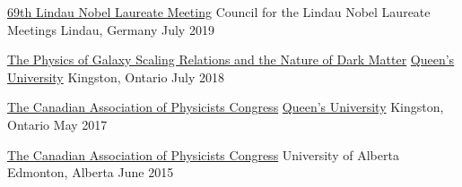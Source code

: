 \begin{cvhonors}
  \cvhonor
    {\href{https://www.lindau-nobel.org/}{69th Lindau Nobel Laureate Meeting}} %
    {Council for the Lindau Nobel Laureate Meetings} %
    {Lindau, Germany} %
    {July 2019} %

    
  \cvhonor
    {\href{https://darkmatter2018.weebly.com/}{The Physics of Galaxy Scaling Relations and the Nature of Dark Matter}} %
    {\href{https://www.queensu.ca/}{Queen's University}} %
    {Kingston, Ontario} %
    {July 2018} %

    
  \cvhonor
    {\href{https://www.cap.ca/congress-conference/past-congress/congress-2017/}{The Canadian Association of Physicists Congress}} %
    {\href{https://www.queensu.ca/}{Queen's University}} %
    {Kingston, Ontario} %
    {May 2017} %

    
  \cvhonor
    {\href{https://www.cap.ca/congress-conference/past-congress/congress-2015/}{The Canadian Association of Physicists Congress}} %
    {University of Alberta} %
    {Edmonton, Alberta} %
    {June 2015} %
        
\end{cvhonors}